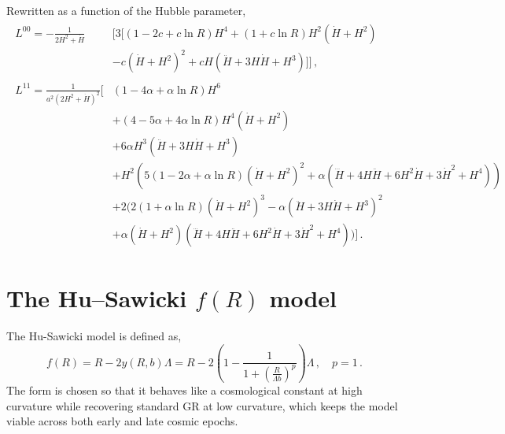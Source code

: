 \documentclass{book}
\begin{document}
	Rewritten as a function of the Hubble parameter,
	\begin{equation}
		\begin{matrix}
				\begin{aligned}
					L^{00}  = -\frac{1}{2H^2 + \dot{H}} & \Big[ 3 \big[ \left(1 - 2c + c \ln R\right) H^4  + \left(1 + c \ln R\right) H^2 (\dot{H} + H^2) \\  \, & - c (\dot{H} + H^2)^2 + c H (\ddot{H} + 3H\dot{H} + H^3) \big] \Big] \, ,
			 \,  \\ \, \\
		 	L^{11} = \frac{1}{a^2 (2H^2 + \dot{H})^2} \Big[ &\left(1 - 4\alpha + \alpha \ln R\right) H^6 \\ &+ \left(4 - 5\alpha + 4\alpha \ln R\right) H^4 (\dot{H} + H^2) \\ &+ 6\alpha H^3 (\ddot{H} + 3H\dot{H} + H^3) \\ &+ H^2 \left( 5\left(1 - 2\alpha + \alpha \ln R\right)(\dot{H} + H^2)^2 + \alpha (\dddot{H} + 4H\ddot{H} + 6H^2\dot{H} + 3\dot{H}^2 + H^4) \right) \\ &+ 2 \Big( 2\left(1 + \alpha \ln R\right)(\dot{H} + H^2)^3 - \alpha (\ddot{H} + 3H\dot{H} + H^3)^2 \\ \, &+ \alpha (\dot{H} + H^2)(\dddot{H} + 4H\ddot{H} + 6H^2\dot{H} + 3\dot{H}^2 + H^4) \Big) \Big] \, . \end{aligned}
		\end{matrix} 
	\end{equation}
	\section{The Hu–Sawicki $f(R)$ model}
	The Hu-Sawicki model is defined as,
	\begin{equation}
		f(R)=R-2y(R,b)\Lambda = R-2\left( 1 - \frac{1}{1+\left( \frac{R}{\Lambda b} \right) ^p } \right)\Lambda \, , \quad p=1 \, .
		\end{equation}
	The form is chosen so that it behaves like a cosmological constant at high curvature while recovering standard GR at low curvature, which keeps the model viable across both early and late cosmic epochs.
	
\end{document}
